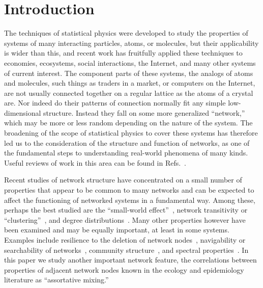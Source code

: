 \documentclass[twocolumn,pre]{revtex4}
\begin{document}
\section{Introduction}
\label{intro}
The techniques of statistical physics were developed to study the
properties of systems of many interacting particles, atoms, or molecules,
but their applicability is wider than this, and recent work has fruitfully
applied these techniques to economies, ecosystems, social interactions, the
Internet, and many other systems of current interest.  The component parts
of these systems, the analogs of atoms and molecules, such things as
traders in a market, or computers on the Internet, are not usually
connected together on a regular lattice as the atoms of a crystal are.  Nor
indeed do their patterns of connection normally fit any simple
low-dimensional structure.  Instead they fall on some more generalized
``network,'' which may be more or less random depending on the nature of
the system.  The broadening of the scope of statistical physics to cover
these systems has therefore led us to the consideration of the structure
and function of networks, as one of the fundamental steps to understanding
real-world phenomena of many kinds.  Useful reviews of work in this area
can be found in Refs.~.

Recent studies of network structure have concentrated on a small number of
properties that appear to be common to many networks and can be expected to
affect the functioning of networked systems in a fundamental way.  Among
these, perhaps the best studied are the ``small-world
effect''~\cite{TM69,WS98}, network transitivity or
``clustering''~\cite{WS98}, and degree distributions~\cite{BA99b,ASBS00}.
Many other properties however have been examined and may be equally
important, at least in some systems.  Examples include resilience to the
deletion of network nodes~\cite{AJB00,Broder00,CEBH00,CNSW00,Holme02a},
navigability or searchability of
networks~\cite{Kleinberg00proc,ALPH01,WDN02}, community
structure~\cite{GN02,HHJ02,Guimera03}, and spectral
properties~\cite{Monasson99,GKK01,FDBV01}.  In this paper we study another
important network feature, the correlations between properties of adjacent
network nodes known in the ecology and epidemiology literature as
``assortative mixing.''
\end{document}
